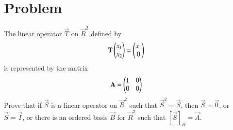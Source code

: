 \documentclass[journal,12pt,twocolumn]{IEEEtran}
\begin{document}
\section{Problem}
The linear operator $\vec{T}$ on $\vec{R}^2$ defined by 
\begin{align*}
	\mathbf{T}\begin{pmatrix}x_1\\x_2\end{pmatrix}=\begin{pmatrix}x_1\\0\end{pmatrix}
\end{align*}
is represented by the matrix
\begin{align*}
	\mathbf{A}=\begin{pmatrix}1&0\\
		       0&0\end{pmatrix}
\end{align*}
Prove that if $\vec{S}$ is a linear operator on $\vec{R}^2$ such that $\vec{S}^2=\vec{S}$, 
then $\vec{S}=\vec{0}$, or $\vec{S}=\vec{I}$, or there is an ordered basis $\vec{B}$ for $\vec{R}^2$ 
such that $[\vec{S}]_B=\vec{A}$.
\end{document}

